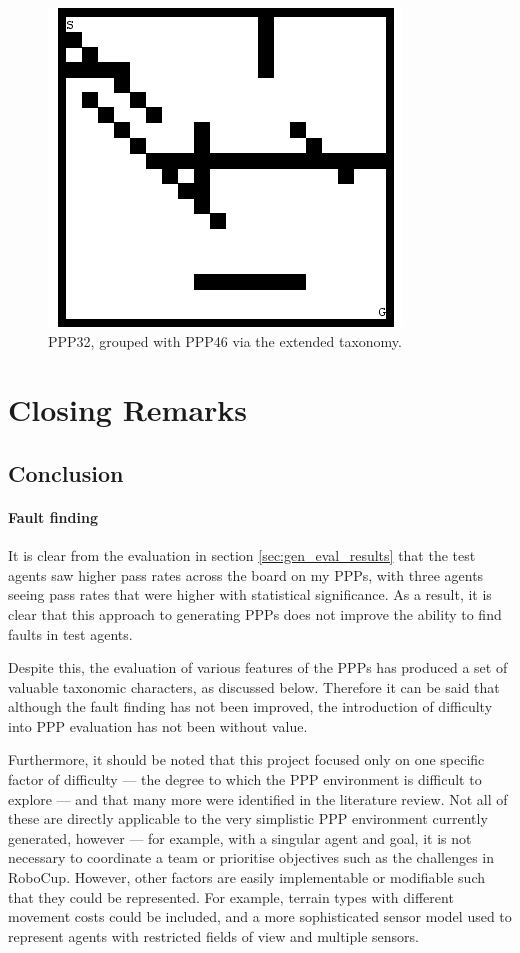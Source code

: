 \documentclass[authoryearcitations]{UoYCSproject}
\begin{document}
\begin{figure}[H]
\graphicspath{ {EvalPics/} }
\includegraphics[scale=0.65]{ppp32.png}
\caption{PPP32, grouped with PPP46 via the extended taxonomy.}
\label{fig:ppp_32}
\end{figure}

\part{Closing Remarks}
\label{sec:close}
\chapter{Conclusion}
\label{cha:conclusion}
\subsection{Fault finding}
\label{sec:conc_fault}
It is clear from the evaluation in section \ref{sec:gen_eval_results} that the test agents saw higher pass rates across the board on my PPPs, with three agents seeing pass rates that were higher with statistical significance. As a result, it is clear that this approach to generating PPPs does not improve the ability to find faults in test agents.

Despite this, the evaluation of various features of the PPPs has produced a set of valuable taxonomic characters, as discussed below. Therefore it can be said that although the fault finding has not been improved, the introduction of difficulty into PPP evaluation has not been without value.

Furthermore, it should be noted that this project focused only on one specific factor of difficulty --- the degree to which the PPP environment is difficult to explore --- and that many more were identified in the literature review. Not all of these are directly applicable to the very simplistic PPP environment currently generated, however --- for example, with a singular agent and goal, it is not necessary to coordinate a team or prioritise objectives such as the challenges in RoboCup. However, other factors are easily implementable or modifiable such that they could be represented. For example, terrain types with different movement costs could be included, and a more sophisticated sensor model used to represent agents with restricted fields of view and multiple sensors.
\end{document}
